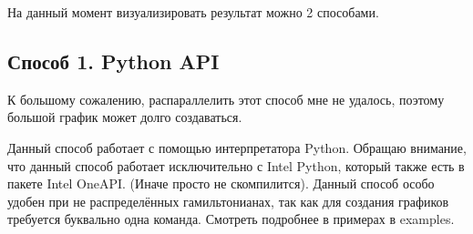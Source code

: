 \documentclass[12pt,fleqn]{article}
\begin{document}
    На данный момент визуализировать результат можно 2 способами.

    \subsection{Способ 1. Python API}

    К большому сожалению, распараллелить этот способ мне не удалось, поэтому большой график может долго создаваться.

    Данный способ работает с помощью интерпретатора Python. Обращаю внимание, что данный способ работает исключительно с \textsf{Intel Python}, который также есть в пакете \textsf{Intel OneAPI}.
    (Иначе просто не скомпилится). Данный способ особо удобен при не распределённых гамильтонианах, так как для создания графиков требуется буквально одна команда. 
    Смотреть подробнее в примерах в \textsf{examples}.
\end{document}
